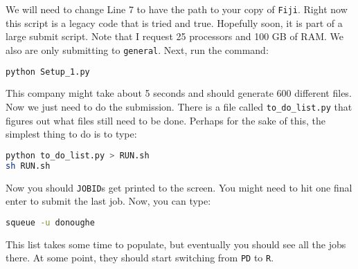\documentclass[11pt]{article}
\begin{document}
We will need to change Line 7 to have the path to your copy of \texttt{Fiji}. Right now this script is a legacy code that is tried and true. Hopefully soon, it is part of a large submit script. Note that I request 25 processors and 100 GB of RAM.  We also are only submitting to \texttt{general}. Next, run the command:
\begin{lstlisting}[language=bash, caption=Run Setup]
python Setup_1.py
\end{lstlisting}
This company might take about 5 seconds and should generate 600 different files. Now we just need to do the submission. There is a file called \texttt{to\_do\_list.py} that figures out what files still need to be done. Perhaps for the sake of this, the simplest thing to do is to type:
\begin{lstlisting}[language=bash, caption=Run Setup]
python to_do_list.py > RUN.sh
sh RUN.sh
\end{lstlisting}
Now you should \texttt{JOBID}s get printed to the screen. You might need to hit one final enter to submit the last job. Now, you can type:
\begin{lstlisting}[language=bash, caption=Check Status]
squeue -u donoughe
\end{lstlisting}
This list takes some time to populate, but eventually you should see all the jobs there. At some point, they should start switching from \texttt{PD} to \texttt{R}. 
\end{document}
